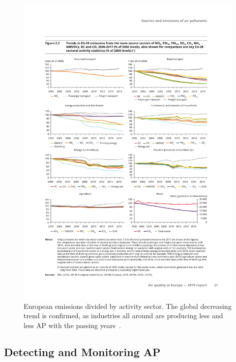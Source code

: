 \begin{figure}[htpb]
    \centering
    \includegraphics[clip,%
        trim=0cm 6.5cm 0cm 5.3cm,%
        width=\textwidth]{img/pdf/european_emissions_by_sector.pdf}
    \caption{European emissions divided by activity sector. The global
    decreasing trend is confirmed, as industries all around are
    producing less and less \gls{AP} with the passing years~\cite{EEA2019}.}
    \label{fig:european_emissions_by_sector}
\end{figure}

\subsection{Detecting and Monitoring \acrlong{AP}}%
\label{sub:detecting_and_monitoring_ap}

